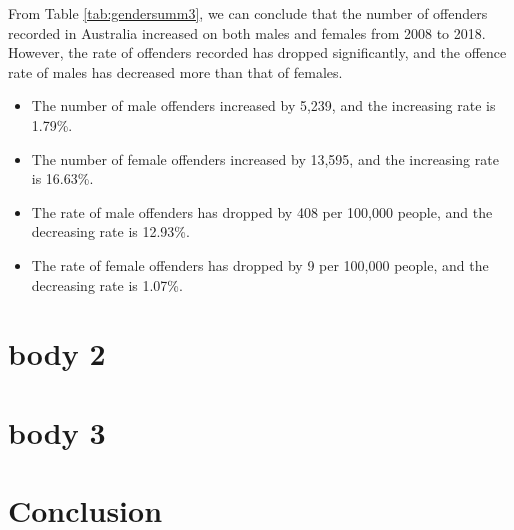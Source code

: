 \documentclass[11pt,a4paper,]{article}
\providecommand{\tightlist}{%
  \setlength{\itemsep}{0pt}\setlength{\parskip}{0pt}}
\begin{document}
From Table \ref{tab:gendersumm3}, we can conclude that the number of offenders recorded in Australia increased on both males and females from 2008 to 2018. However, the rate of offenders recorded has dropped significantly, and the offence rate of males has decreased more than that of females.

\begin{itemize}
\tightlist
\item
  The number of male offenders increased by 5,239, and the increasing rate is 1.79\%.\\
\item
  The number of female offenders increased by 13,595, and the increasing rate is 16.63\%.\\
\item
  The rate of male offenders has dropped by 408 per 100,000 people, and the decreasing rate is 12.93\%.\\
\item
  The rate of female offenders has dropped by 9 per 100,000 people, and the decreasing rate is 1.07\%.
\end{itemize}

\section*{body 2}

\section*{body 3}

\hypertarget{conclusion}{%
\section{Conclusion}\label{conclusion}}

\printbibliography[title=Reference]
\end{document}
